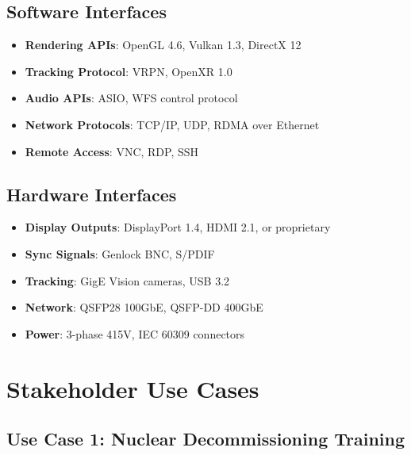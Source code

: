 \subsection{Software Interfaces}

\begin{itemize}
    \item \textbf{Rendering APIs}: OpenGL 4.6, Vulkan 1.3, DirectX 12
    \item \textbf{Tracking Protocol}: VRPN, OpenXR 1.0
    \item \textbf{Audio APIs}: ASIO, WFS control protocol
    \item \textbf{Network Protocols}: TCP/IP, UDP, RDMA over Ethernet
    \item \textbf{Remote Access}: VNC, RDP, SSH
\end{itemize}

\subsection{Hardware Interfaces}

\begin{itemize}
    \item \textbf{Display Outputs}: DisplayPort 1.4, HDMI 2.1, or proprietary
    \item \textbf{Sync Signals}: Genlock BNC, S/PDIF
    \item \textbf{Tracking}: GigE Vision cameras, USB 3.2
    \item \textbf{Network}: QSFP28 100GbE, QSFP-DD 400GbE
    \item \textbf{Power}: 3-phase 415V, IEC 60309 connectors
\end{itemize}

\section{Stakeholder Use Cases}

\subsection{Use Case 1: Nuclear Decommissioning Training}

